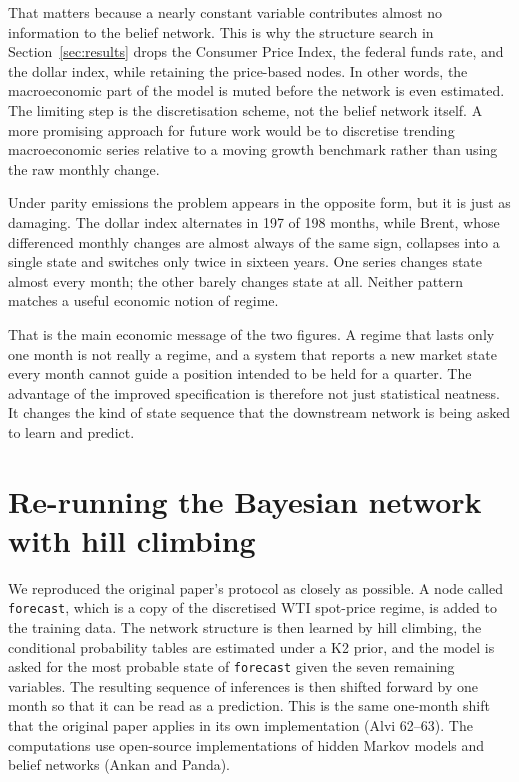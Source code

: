 \documentclass[11pt,a4paper]{article}
\begin{document}
That matters because a nearly constant variable contributes almost no information to the belief
network. This is why the structure search in Section~\ref{sec:results} drops the Consumer Price
Index, the federal funds rate, and the dollar index, while retaining the price-based nodes. In
other words, the macroeconomic part of the model is muted before the network is even estimated.
The limiting step is the discretisation scheme, not the belief network itself. A more promising
approach for future work would be to discretise trending macroeconomic series relative to a moving
growth benchmark rather than using the raw monthly change.

Under parity emissions the problem appears in the opposite form, but it is just as damaging. The
dollar index alternates in 197 of 198 months, while Brent, whose differenced monthly changes are
almost always of the same sign, collapses into a single state and switches only twice in sixteen
years. One series changes state almost every month; the other barely changes state at all. Neither
pattern matches a useful economic notion of regime.

That is the main economic message of the two figures. A regime that lasts only one month is not
really a regime, and a system that reports a new market state every month cannot guide a position
intended to be held for a quarter. The advantage of the improved specification is therefore not
just statistical neatness. It changes the kind of state sequence that the downstream network is
being asked to learn and predict.

\section{Re-running the Bayesian network with hill climbing}
\label{sec:replication}

We reproduced the original paper's protocol as closely as possible. A node called
\texttt{forecast}, which is a copy of the discretised WTI spot-price regime, is added to
the training data. The network structure is then learned by hill climbing, the conditional
probability tables are estimated under a K2 prior, and the model is asked for the most probable
state of \texttt{forecast} given the seven remaining variables. The resulting sequence of
inferences is then shifted forward by one month so that it can be read as a prediction. This is the
same one-month shift that the original paper applies in its own implementation (Alvi 62--63). The
computations use open-source implementations of hidden Markov models and belief networks (Ankan
and Panda).
\end{document}
